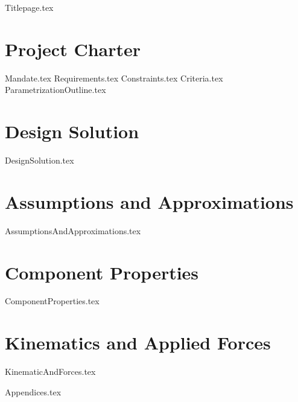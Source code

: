 \documentclass[letterpaper,12pt,onecolumn,titlepage,twoside]{article}
\begin{document}
{Titlepage.tex}

\clearpage\mbox{}\clearpage %


\tableofcontents

\newpage

\listoffigures
\listoftables

\newpage



\section{Project Charter} \label{sec:charter}
{Mandate.tex}
{Requirements.tex}
{Constraints.tex}
{Criteria.tex}
{ParametrizationOutline.tex}

\newpage

\section{Design Solution} \label{sec:design_solution}
{DesignSolution.tex}

\newpage

\section{Assumptions and Approximations} \label{sec:assumptions}
{AssumptionsAndApproximations.tex}

\newpage

\section{Component Properties} \label{sec:component_pro}
{ComponentProperties.tex}

\newpage

\section{Kinematics and Applied Forces} \label{sec:kinematics_and_forces}
{KinematicAndForces.tex}

\newpage




\newpage

\begin{appendices}
    {Appendices.tex}
\end{appendices}
\end{document}
